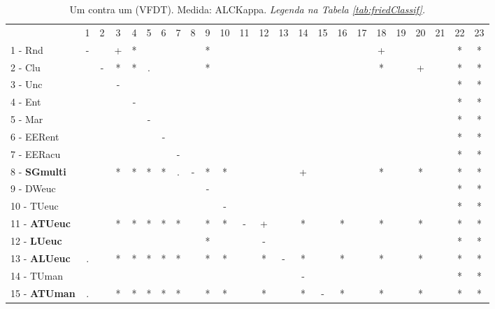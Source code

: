 \begin{table}[h]
\caption{Um contra um (VFDT). Medida: ALCKappa. \textit{Legenda na Tabela \ref{tab:friedClassif}.}}
\begin{center}\begin{tabular}{lcc|cc|cc|cc|cc|cc|cc|cc|cc|cc|cc|c}
 			& 1 & 2 & 3 & 4 & 5 & 6 & 7 & 8 & 9 & 10 & 11 & 12 & 13 & 14 & 15 & 16 & 17 & 18 & 19 & 20 & 21 & 22 & 23\\
1 - Rnd  	& - &   & + & * &   &   &   &   & * &   &   &   &   &   &   &   &   & + &   &   &   & * & * \\
2 - Clu  	&   & - & * & * & . &   &   &   & * &   &   &   &   &   &   &   &   & * &   & + &   & * & * \\ \hline
3 - Unc  	&   &   & - &   &   &   &   &   &   &   &   &   &   &   &   &   &   &   &   &   &   & * & * \\
4 - Ent  	&   &   &   & - &   &   &   &   &   &   &   &   &   &   &   &   &   &   &   &   &   & * & * \\ \hline
5 - Mar  	&   &   &   &   & - &   &   &   &   &   &   &   &   &   &   &   &   &   &   &   &   & * & * \\
6 - EERent	&   &   &   &   &   & - &   &   &   &   &   &   &   &   &   &   &   &   &   &   &   & * & * \\ \hline
7 - EERacu	&   &   &   &   &   &   & - &   &   &   &   &   &   &   &   &   &   &   &   &   &   & * & * \\
8 - \textbf{SGmulti}	&   &   & * & * & * & * & . & - & * & * &   &   &   & + &   &   &   & * &   & * &   & * & * \\ \hline
9 - DWeuc	&   &   &   &   &   &   &   &   & - &   &   &   &   &   &   &   &   &   &   &   &   & * & * \\
10 - TUeuc	&   &   &   &   &   &   &   &   &   & - &   &   &   &   &   &   &   &   &   &   &   & * & * \\ \hline
11 - \textbf{ATUeuc}	&   &   & * & * & * & * & * &   & * & * & - & + &   & * &   & * &   & * &   & * &   & * & * \\
12 - \textbf{LUeuc}	&   &   &   &   &   &   &   &   & * &   &   & - &   &   &   &   &   &   &   &   &   & * & * \\ \hline
13 - \textbf{ALUeuc}	& . &   & * & * & * & * & * &   & * & * &   & * & - & * &   & * &   & * &   & * &   & * & * \\
14 - TUman	&   &   &   &   &   &   &   &   &   &   &   &   &   & - &   &   &   &   &   &   &   & * & * \\ \hline
15 - \textbf{ATUman}	& . &   & * & * & * & * & * &   & * & * &   & * &   & * & - & * &   & * &   & * &   & * & * \\

\end{tabular}
\end{center}
\end{table}
